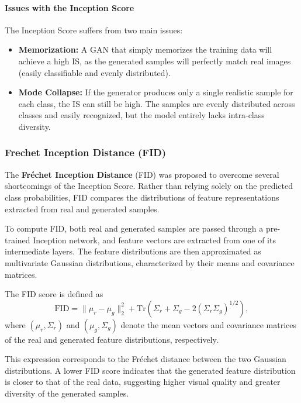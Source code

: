 \paragraph{Issues with the Inception Score}
The Inception Score suffers from two main issues:
\begin{itemize}
    \item \textbf{Memorization:} A GAN that simply memorizes the training data will achieve a high IS, as the generated samples will perfectly match real images (easily classifiable and evenly distributed).
    \item \textbf{Mode Collapse:} If the generator produces only a single realistic sample for each class, the IS can still be high. The samples are evenly distributed across classes and easily recognized, but the model entirely lacks intra-class diversity.
\end{itemize}

\subsubsection{Frechet Inception Distance (FID)}

The \textbf{Fréchet Inception Distance} (FID) was proposed to overcome several shortcomings of the Inception Score. 
Rather than relying solely on the predicted class probabilities, FID compares the distributions of feature representations extracted from real and generated samples.

To compute FID, both real and generated samples are passed through a pre-trained Inception network, and feature vectors are extracted from one of its intermediate layers. 
The feature distributions are then approximated as multivariate Gaussian distributions, characterized by their means and covariance matrices.

The FID score is defined as
\begin{equation}
    \mathrm{FID} =
    \|\mu_r-\mu_g\|_2^2 +
    \mathrm{Tr}\!\left(
        \Sigma_r+\Sigma_g
        -2(\Sigma_r\Sigma_g)^{1/2}
    \right),
\end{equation}
where $(\mu_r,\Sigma_r)$ and $(\mu_g,\Sigma_g)$ denote the mean vectors and covariance matrices of the real and generated feature distributions, respectively.

This expression corresponds to the Fréchet distance between the two Gaussian distributions.
A lower FID score indicates that the generated feature distribution is closer to that of the real data, suggesting higher visual quality and greater diversity of the generated samples.

